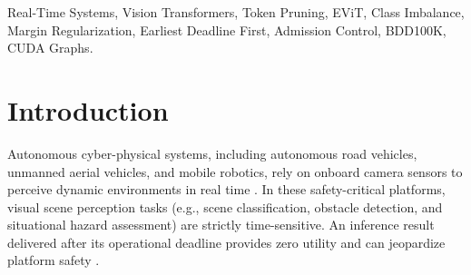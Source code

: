 \documentclass[conference]{IEEEtran}
\begin{document}
\begin{abstract}
We evaluate our system on the complete 6-class BDD100K driving scene dataset (99,483 valid images across 19,902 held-out test frames). A rigorous three-seed matched validation study ($N=3$, seeds 42, 123, 456) demonstrates that EViT $k=0.7$ with CB-CMPR achieves $77.88 \pm 0.15\%$ Top-1 accuracy ($+1.37 \pm 0.33$~pp over pure CB-CE, exploratory paired $t=7.19, p=0.0188$), reducing cross-seed standard deviation by 67.4\% ($\sigma = 0.15\%$ vs.\ $0.46\%$) and improving Weighted-F1 to $77.57 \pm 0.14\%$ ($+0.88 \pm 0.25$~pp). We explicitly analyze the unweighted 6-class Macro-F1 trade-off ($59.41 \pm 4.35\%$ vs.\ $61.47 \pm 3.76\%$), proving mathematically that this gap is driven entirely by the 6-sample Gas Station test support ($n=6$, 0.030\% of test set), whereas on the remaining five classes CMPR is strictly superior across all seeds ($+1.17 \pm 0.50$~pp). On a dedicated NVIDIA GeForce RTX 4060 GPU, EViT $k=0.7$ cuts arithmetic complexity by 34.1\% (3.03 vs.\ 4.60 GMACs) and scales throughput to 629.0~FPS ($+51.5\%$ over unpruned DeiT). Captured static CUDA Graphs reduce median batch-1 latency from 15.48~ms to 2.83~ms. Across a discrete-event simulation suite of 70 workload-policy configurations, our proposed adaptive scheduler improves on-time completion ratios by up to $+73$~percentage points over static baselines under heavy traffic saturation (79\% vs.\ 6\%), while live GPU trace replay over 100 test images confirms makespan agreement within $-0.57\%$ to $-0.07\%$.
\end{abstract}

\begin{IEEEkeywords}
Real-Time Systems, Vision Transformers, Token Pruning, EViT, Class Imbalance, Margin Regularization, Earliest Deadline First, Admission Control, BDD100K, CUDA Graphs.
\end{IEEEkeywords}

\section{Introduction}

Autonomous cyber-physical systems, including autonomous road vehicles, unmanned aerial vehicles, and mobile robotics, rely on onboard camera sensors to perceive dynamic environments in real time \cite{grigorescu2020survey, yu2020bdd100k}. In these safety-critical platforms, visual scene perception tasks (e.g., scene classification, obstacle detection, and situational hazard assessment) are strictly time-sensitive. An inference result delivered after its operational deadline provides zero utility and can jeopardize platform safety \cite{buttazzo2011hard}.
\end{document}
